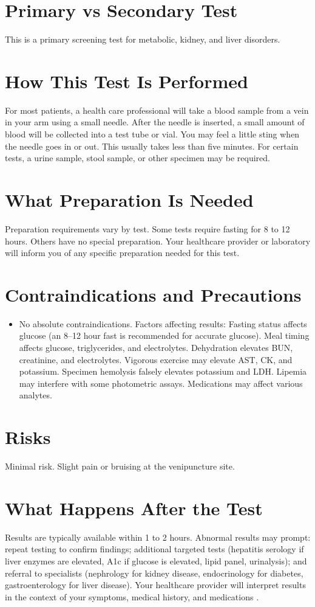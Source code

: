 \section*{Primary vs Secondary Test}
This is a primary screening test for metabolic, kidney, and liver disorders.

\section*{How This Test Is Performed}
For most patients, a health care professional will take a blood sample from a vein in your arm using a small needle. After the needle is inserted, a small amount of blood will be collected into a test tube or vial. You may feel a little sting when the needle goes in or out. This usually takes less than five minutes. For certain tests, a urine sample, stool sample, or other specimen may be required.

\section*{What Preparation Is Needed}
Preparation requirements vary by test. Some tests require fasting for 8 to 12 hours. Others have no special preparation. Your healthcare provider or laboratory will inform you of any specific preparation needed for this test.

\section*{Contraindications and Precautions}
\begin{itemize}
  \item No absolute contraindications. Factors affecting results: Fasting status affects glucose (an 8--12 hour fast is recommended for accurate glucose). Meal timing affects glucose, triglycerides, and electrolytes. Dehydration elevates BUN, creatinine, and electrolytes. Vigorous exercise may elevate AST, CK, and potassium. Specimen hemolysis falsely elevates potassium and LDH. Lipemia may interfere with some photometric assays. Medications may affect various analytes.
\end{itemize}
\section*{Risks}
Minimal risk. Slight pain or bruising at the venipuncture site.

\section*{What Happens After the Test}
Results are typically available within 1 to 2 hours. Abnormal results may prompt: repeat testing to confirm findings; additional targeted tests (hepatitis serology if liver enzymes are elevated, A1c if glucose is elevated, lipid panel, urinalysis); and referral to specialists (nephrology for kidney disease, endocrinology for diabetes, gastroenterology for liver disease). Your healthcare provider will interpret results in the context of your symptoms, medical history, and medications \cite{tierney2023current}.

